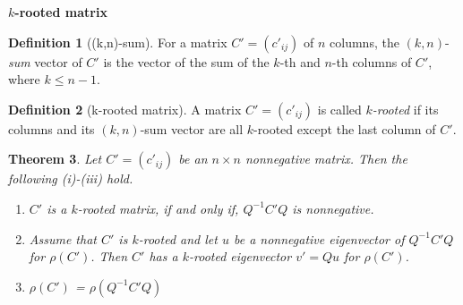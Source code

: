 \documentclass{beamer}
\theoremstyle{plain}
\newtheorem{thm}{Theorem}[section]
\theoremstyle{definition}
\newtheorem{defn}[thm]{Definition}
\begin{document}

    {\bf $k$-rooted matrix}
    \begin{defn}[(k,n)-sum]
        For a matrix $C'=(c'_{ij})$ of $n$ columns, the $(k, n)$-{\it sum} vector of $C'$ is the vector of the sum of the $k$-th and  $n$-th columns of $C'$, where $k\leq n-1$.
    \end{defn}

    \begin{defn}[k-rooted matrix]\label{m_rooted}
        A  matrix $C'=(c'_{ij})$ is called {\it $k$-rooted}  if its  columns and its $(k, n)$-sum vector are all $k$-rooted except the last column of $C'$.
    \end{defn}


    \begin{thm} \label{lma_m_rooted}
        Let $C'=(c'_{ij})$ be an $n\times n$ nonnegative matrix. Then the following (i)-(iii) hold.
            \begin{enumerate}
                \item[(i)]$C'$ is a $k$-rooted matrix, if and only if, $Q^{-1}C'Q$ is nonnegative.
                \item[(ii)]Assume that $C'$ is $k$-rooted and let $u$ be a nonnegative eigenvector of $Q^{-1}C'Q$ for $\rho(C')$. Then  $C'$ has a $k$-rooted eigenvector $v'=Qu$ for $\rho(C')$. 
                \item[(iii)] $\rho(C')$ = $\rho(Q^{-1}C'Q)$
            \end{enumerate}
        \end{thm}

\end{document}
